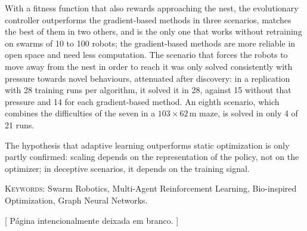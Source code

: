 \documentclass[12pt,reqno, twoside]{amsbook}
\makeatletter
\theoremstyle{plain}
\numberwithin{equation}{chapter}
\numberwithin{section}{chapter}
\numberwithin{table}{chapter}
\numberwithin{figure}{chapter}
\def\cleardoublepage{\clearpage\if@twoside%
  \ifodd\c@page\else
  \vspace*{\fill}
  \hfill
  \begin{center}
  {\fontfamily{Montserrat-TOsF}\selectfont\small [ Página intencionalmente deixada em branco. ]}
  \end{center}
  \vspace{\fill}
  \thispagestyle{empty}
  \newpage
 \if@twocolumn\hbox{}\newpage\fi\fi\fi
}
\makeatother
\begin{document}
With a fitness function that also rewards approaching the nest, the evolutionary controller outperforms the gradient-based methods in three scenarios, matches the best of them in two others, and is the only one that works without retraining on swarms of 10 to 100 robots; the gradient-based methods are more reliable in open space and need less computation. The scenario that forces the robots to move away from the nest in order to reach it was only solved consistently with pressure towards novel behaviours, attenuated after discovery: in a replication with 28 training runs per algorithm, it solved it in 28, against 15 without that pressure and 14 for each gradient-based method. An eighth scenario, which combines the difficulties of the seven in a $103 \times 62$\,m maze, is solved in only 4 of 21 runs.

The hypothesis that adaptive learning outperforms static optimization is only partly confirmed: scaling depends on the representation of the policy, not on the optimizer; in deceptive scenarios, it depends on the training signal.

\vspace{3ex}
\textsc{Keywords:} Swarm Robotics, Multi-Agent Reinforcement Learning, Bio-inspired Optimization, Graph Neural Networks.

\setcounter{tocdepth}{2}
\tableofcontents
\listoffigures
\listoftables
\cleardoublepage
\end{document}
